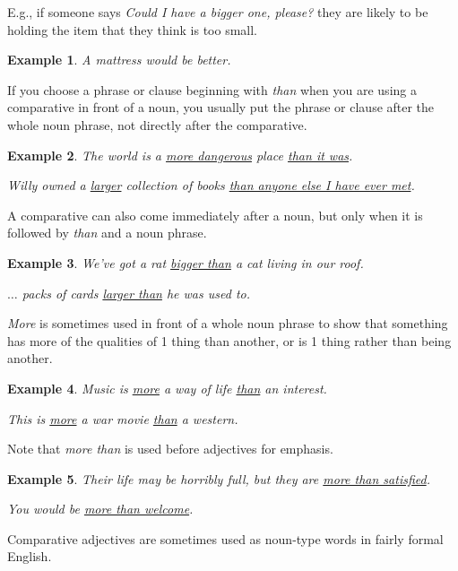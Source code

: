 \documentclass[oneside]{book}
\numberwithin{equation}{section}
\newtheorem{example}{Example}[section]
\begin{document}
E.g., if someone says \textit{Could I have a bigger one, please?} they are likely to be holding the item that they think is too small.
\begin{example}
    A mattress would be better.
\end{example}
%
\noindent{} If you choose a phrase or clause beginning with \textit{than} when you are using a comparative in front of a noun, you usually put the phrase or clause after the whole noun phrase, not directly after the comparative.
\begin{example}
    The world is a \underline{more dangerous} place \underline{than it was}.
    
    Willy owned a \underline{larger} collection of books \underline{than anyone else I have ever met}.
\end{example}
A comparative can also come immediately after a noun, but only when it is followed by \textit{than} and a noun phrase.
\begin{example}
    We've got a rat \underline{bigger than} a cat living in our roof.
    
    $\ldots$ packs of cards \underline{larger than} he was used to.
\end{example}
%
\noindent{} \textit{More} is sometimes used in front of a whole noun phrase to show that something has more of the qualities of 1 thing than another, or is 1 thing rather than being another.
\begin{example}
    Music is \underline{more} a way of life \underline{than} an interest.
    
    This is \underline{more} a war movie \underline{than} a western.
\end{example}
Note that \textit{more than} is used before adjectives for emphasis.
\begin{example}
    Their life may be horribly full, but they are \underline{more than satisfied}.
    
    You would be \underline{more than welcome}.
\end{example}
%
\noindent{} Comparative adjectives are sometimes used as noun-type words in fairly formal English.
\end{document}
